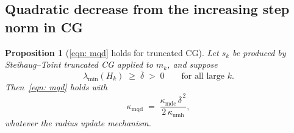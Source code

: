 \documentclass[11pt]{article}
\theoremstyle{plain}
\newtheorem{proposition}[theorem]{Proposition}
\theoremstyle{definition}
\theoremstyle{remark}
\numberwithin{equation}{section}
\newcommand*\mykappa[1]{\kappa_{\scriptscriptstyle\text{#1}}}
\begin{document}
\subsection{Quadratic decrease from the increasing step norm in CG}


\begin{proposition}[\eqref{eqn: mqd} holds for truncated CG]
\label{prop: mqd cg}
    Let $s_k$ be produced by Steihaug--Toint truncated CG applied to $m_k$, and suppose
    \begin{equation}
        \lambda_{\min}(H_k) \;\geq\; \bar\delta \;>\; 0
        \qquad \text{for all large } k .
        \label{eqn: uniform pd model}
    \end{equation}
    Then~\eqref{eqn: mqd} holds with
    \begin{equation}
        \mykappa{mqd} \;=\; \frac{\mykappa{mdc}\,\bar\delta^{\,2}}{2\,\mykappa{umh}} ,
        \label{eqn: mqd constant}
    \end{equation}
    whatever the radius update mechanism.
\end{proposition}
\end{document}
